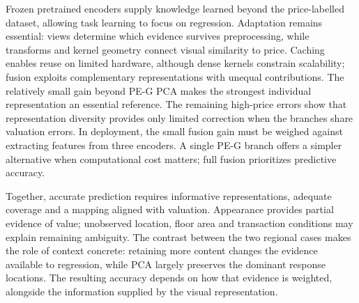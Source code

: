 \documentclass[conference,a4paper]{IEEEtran}
\begin{document}
Frozen pretrained encoders supply knowledge learned beyond the price-labelled dataset, allowing task learning to focus on regression. Adaptation remains essential: views determine which evidence survives preprocessing, while transforms and kernel geometry connect visual similarity to price. Caching enables reuse on limited hardware, although dense kernels constrain scalability; fusion exploits complementary representations with unequal contributions. The relatively small gain beyond PE-G PCA makes the strongest individual representation an essential reference. The remaining high-price errors show that representation diversity provides only limited correction when the branches share valuation errors. In deployment, the small fusion gain must be weighed against extracting features from three encoders. A single PE-G branch offers a simpler alternative when computational cost matters; full fusion prioritizes predictive accuracy.

Together, accurate prediction requires informative representations, adequate coverage and a mapping aligned with valuation. Appearance provides partial evidence of value; unobserved location, floor area and transaction conditions may explain remaining ambiguity. The contrast between the two regional cases makes the role of context concrete: retaining more content changes the evidence available to regression, while PCA largely preserves the dominant response locations. The resulting accuracy depends on how that evidence is weighted, alongside the information supplied by the visual representation.
\end{document}
